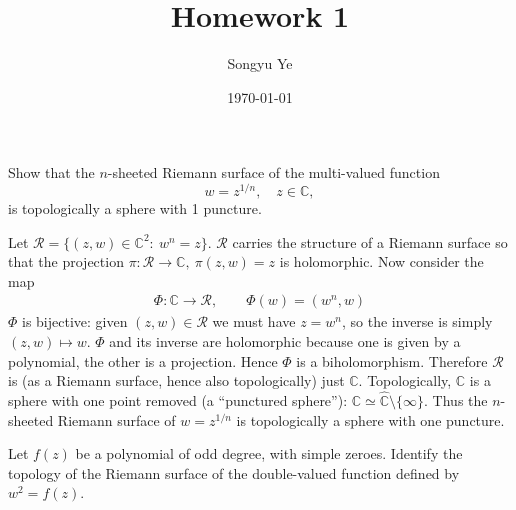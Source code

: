 \documentclass[12pt]{article}  %
\title{Homework 1}
\author{Songyu Ye}
\date{\today}
\begin{document}
\psettitle


\begin{problem}{1}
Show that the $n$-sheeted Riemann surface of the multi-valued function 
\[
w = z^{1/n}, \quad z \in \mathbb{C},
\]
is topologically a sphere with 1 puncture.
\end{problem}

\begin{solution}
Let $\mathcal{R}=\{(z,w)\in\mathbb C^2:\ w^n=z\}$. $\mathcal{R}$ carries the structure of a Riemann surface so that the projection
$\pi:\mathcal{R}\to\mathbb{C},\ \pi(z,w)=z$ is holomorphic. Now consider the map \begin{align*}
    \Phi:\mathbb{C}\longrightarrow \mathcal{R},\qquad \Phi(w)=(w^n,w)
\end{align*} $\Phi$ is bijective: given $(z,w)\in\mathcal{R}$ we must have $z=w^n$, so the inverse is simply $(z,w)\mapsto w$. $\Phi$ and its inverse are holomorphic because one is given by a polynomial, the other is a projection. Hence $\Phi$ is a biholomorphism. Therefore $\mathcal{R}$ is (as a Riemann surface, hence also topologically) just $\mathbb{C}$. Topologically, $\mathbb{C}$ is a sphere with one point removed (a “punctured sphere”): $\mathbb{C}\simeq \widehat{\mathbb{C}}\setminus\{\infty\}$. Thus the $n$-sheeted Riemann surface of $w=z^{1/n}$ is topologically a sphere with one puncture.
\end{solution}

\begin{problem}{2}
Let $f(z)$ be a polynomial of odd degree, with simple zeroes. Identify the topology of the Riemann surface of the double-valued function defined by $w^2 = f(z)$.
\end{problem}       
\end{document}
